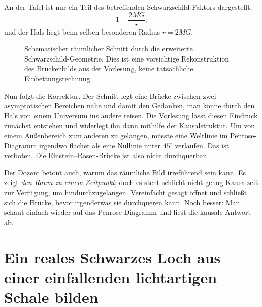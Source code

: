 An der Tafel ist nur ein Teil des betreffenden Schwarzschild-Faktors dargestellt,
\begin{equation}
1-\frac{2MG}{r},
\end{equation}
und der Hals liegt beim selben besonderen Radius \(r=2MG\).

\begin{figure}[htbp]\centering
{}\caption{Schematischer räumlicher Schnitt durch die erweiterte Schwarzschild-Geometrie. Dies ist eine vorsichtige Rekonstruktion des Brückenbilds aus der Vorlesung, keine tatsächliche Einbettungsrechnung.}\end{figure}

Nun folgt die Korrektur. Der Schnitt legt eine Brücke zwischen zwei asymptotischen Bereichen nahe und damit den Gedanken, man könne durch den Hals von einem Universum ins andere reisen. Die Vorlesung lässt diesen Eindruck zunächst entstehen und widerlegt ihn dann mithilfe der Kausalstruktur. Um von einem Außenbereich zum anderen zu gelangen, müsste eine Weltlinie im Penrose-Diagramm irgendwo flacher als eine Nullinie unter \(45^\circ\) verlaufen. Das ist verboten. Die Einstein--Rosen-Brücke ist also nicht durchquerbar.

Der Dozent betont auch, warum das räumliche Bild irreführend sein kann. Es zeigt \emph{den Raum zu einem Zeitpunkt}; doch es steht schlicht nicht genug Kausalzeit zur Verfügung, um hindurchzugelangen. Vereinfacht gesagt öffnet und schließt sich die Brücke, bevor irgendetwas sie durchqueren kann. Noch besser: Man schaut einfach wieder auf das Penrose-Diagramm und liest die kausale Antwort ab.

\section{Ein reales Schwarzes Loch aus einer einfallenden lichtartigen Schale bilden}

